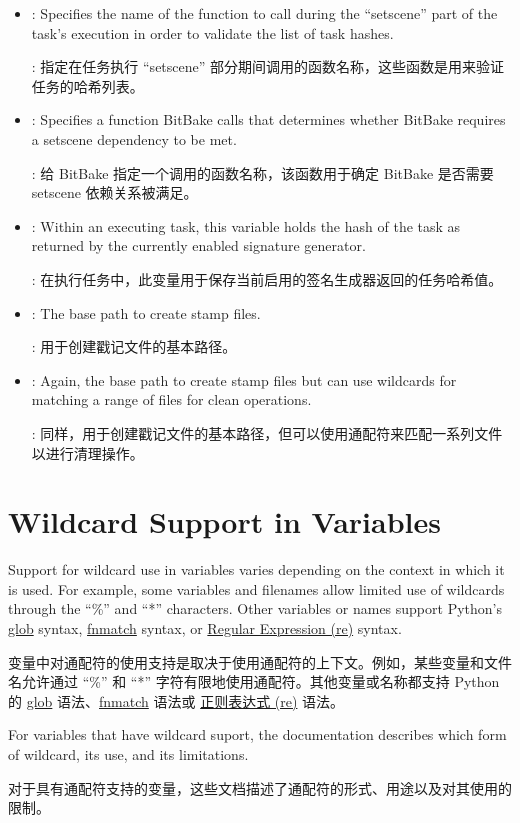 \begin{itemize}
\setlength\itemsep{1.0em}
\item {}: Specifies the name of the function to call during the ``setscene'' part of the task's execution in order to validate the list of task hashes.

\medskip
{}: 指定在任务执行 ``setscene'' 部分期间调用的函数名称，这些函数是用来验证任务的哈希列表。

\item {}: Specifies a function BitBake calls that determines whether BitBake requires a setscene dependency to be met.

\medskip
{}: 给 BitBake 指定一个调用的函数名称，该函数用于确定 BitBake 是否需要 setscene 依赖关系被满足。

\item {}: Within an executing task, this variable holds the hash of the task as returned by the currently enabled signature generator.

\medskip
{}: 在执行任务中，此变量用于保存当前启用的签名生成器返回的任务哈希值。

\item {}: The base path to create stamp files.

\medskip
{}: 用于创建戳记文件的基本路径。

\item {}: Again, the base path to create stamp files but can use wildcards for matching a range of files for clean operations.

\medskip
{}: 同样，用于创建戳记文件的基本路径，但可以使用通配符来匹配一系列文件以进行清理操作。
\end{itemize}

\section{Wildcard Support in Variables}

Support for wildcard use in variables varies depending on the context in which it is used. For example, some variables and filenames allow limited use of wildcards through the ``\%'' and ``*'' characters. Other variables or names support Python's \href{https://docs.python.org/3/library/glob.html}{glob} syntax, \href{https://docs.python.org/3/library/fnmatch.html#module-fnmatch}{fnmatch} syntax, or \href{https://docs.python.org/3/library/re.html}{Regular Expression (re)} syntax.

变量中对通配符的使用支持是取决于使用通配符的上下文。例如，某些变量和文件名允许通过 ``\%'' 和 ``*'' 字符有限地使用通配符。其他变量或名称都支持 Python 的 \href{https://docs.python.org/3/library/glob.html}{glob} 语法、\href{https://docs.python.org/3/library/fnmatch.html#module-fnmatch}{fnmatch} 语法或 \href{https://docs.python.org/3/library/re.html}{正则表达式 (re)} 语法。

For variables that have wildcard suport, the documentation describes which form of wildcard, its use, and its limitations.

对于具有通配符支持的变量，这些文档描述了通配符的形式、用途以及对其使用的限制。
